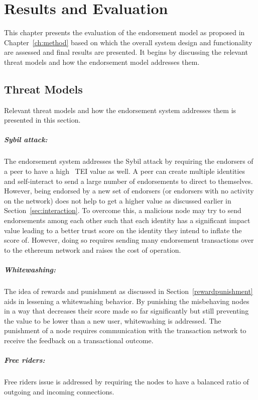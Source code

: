 \chapter{Results and Evaluation} \label{ch:results}
This chapter presents the evaluation of the endorsement model as proposed in
Chapter~\ref{ch:method} based on which the overall system design and
functionality are assessed and final results are presented. It begins by
discussing the relevant threat models and how the endorsement model addresses
them. 

\section{Threat Models}\label{sec:threatModel}
Relevant threat models and how the endorsement system addresses them is
presented in this section. 
\paragraph{Sybil attack:}The endorsement system addresses the Sybil attack by
requiring the endorsers of a peer to have a high ~\ac{TEI} value as well. A
peer can create multiple identities and self-interact to send a large number of
endorsements to direct to themselves. However, being endorsed by a new set of
endorsers (or endorsers with no activity on the network) does not help to get a
higher value as discussed earlier in Section~\ref{sec:interaction}. To overcome
this, a malicious node may try to send endorsements among each other such that
each identity has a significant impact value leading to a better trust score on
the identity they intend to inflate the score of. However, doing so requires
sending many endorsement transactions over to the ethereum network and raises
the cost of operation.   
\paragraph{Whitewashing:} The idea of rewards and punishment as discussed in
Section~\ref{rewardpunishment} aids in lessening a whitewashing behavior. By
punishing the misbehaving nodes in a way that decreases their score made so far
significantly but still preventing the value to be lower than a new user,
whitewashing is addressed. The punishment of a node requires communication with
the transaction network to receive the feedback on a transactional outcome.  
\paragraph{Free riders:} Free riders issue is addressed by requiring the nodes
to have a balanced ratio of outgoing and incoming connections.
